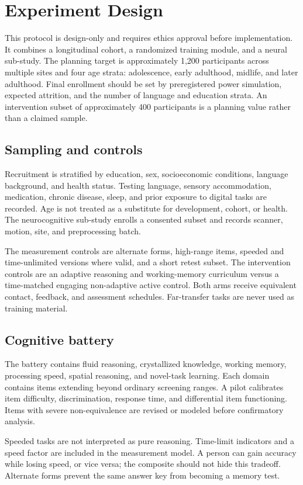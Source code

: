 \documentclass[conference]{IEEEtran}
\begin{document}
\section{Experiment Design}
\label{sec:design}
This protocol is design-only and requires ethics approval before implementation. It combines a longitudinal cohort, a randomized training module, and a neural sub-study. The planning target is approximately 1,200 participants across multiple sites and four age strata: adolescence, early adulthood, midlife, and later adulthood. Final enrollment should be set by preregistered power simulation, expected attrition, and the number of language and education strata. An intervention subset of approximately 400 participants is a planning value rather than a claimed sample.

\subsection{Sampling and controls}
Recruitment is stratified by education, sex, socioeconomic conditions, language background, and health status. Testing language, sensory accommodation, medication, chronic disease, sleep, and prior exposure to digital tasks are recorded. Age is not treated as a substitute for development, cohort, or health. The neurocognitive sub-study enrolls a consented subset and records scanner, motion, site, and preprocessing batch.

The measurement controls are alternate forms, high-range items, speeded and time-unlimited versions where valid, and a short retest subset. The intervention controls are an adaptive reasoning and working-memory curriculum versus a time-matched engaging non-adaptive active control. Both arms receive equivalent contact, feedback, and assessment schedules. Far-transfer tasks are never used as training material.

\subsection{Cognitive battery}
The battery contains fluid reasoning, crystallized knowledge, working memory, processing speed, spatial reasoning, and novel-task learning. Each domain contains items extending beyond ordinary screening ranges. A pilot calibrates item difficulty, discrimination, response time, and differential item functioning. Items with severe non-equivalence are revised or modeled before confirmatory analysis.

Speeded tasks are not interpreted as pure reasoning. Time-limit indicators and a speed factor are included in the measurement model. A person can gain accuracy while losing speed, or vice versa; the composite should not hide this tradeoff. Alternate forms prevent the same answer key from becoming a memory test.
\end{document}
